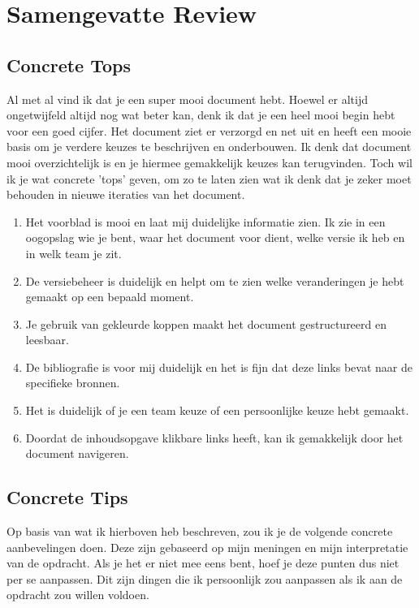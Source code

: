 \documentclass[a4paper]{report}
\begin{document}
\chapter{Samengevatte Review}
\section{Concrete Tops}
Al met al vind ik dat je een super mooi document hebt. Hoewel er altijd ongetwijfeld altijd nog wat beter kan, denk ik dat je een heel mooi begin hebt voor een goed cijfer. 
Het document ziet er verzorgd en net uit en heeft een mooie basis om je verdere keuzes te beschrijven en onderbouwen.
Ik denk dat document mooi overzichtelijk is en je hiermee gemakkelijk keuzes kan terugvinden.
Toch wil ik je wat concrete 'tops' geven, om zo te laten zien wat ik denk dat je zeker moet behouden in nieuwe iteraties van het document. 

\begin{enumerate}
  \item Het voorblad is mooi en laat mij duidelijke informatie zien. Ik zie in een oogopslag wie je bent, waar het document voor dient, welke versie ik heb en in welk team je zit.
  \item De versiebeheer is duidelijk en helpt om te zien welke veranderingen je hebt gemaakt op een bepaald moment.
  \item Je gebruik van gekleurde koppen maakt het document gestructureerd en leesbaar.
  \item De bibliografie is voor mij duidelijk en het is fijn dat deze links bevat naar de specifieke bronnen.
  \item Het is duidelijk of je een team keuze of een persoonlijke keuze hebt gemaakt.
  \item Doordat de inhoudsopgave klikbare links heeft, kan ik gemakkelijk door het document navigeren.
\end{enumerate}

\section{Concrete Tips}
Op basis van wat ik hierboven heb beschreven, zou ik je de volgende concrete aanbevelingen doen. 
Deze zijn gebaseerd op mijn meningen en mijn interpretatie van de opdracht. 
Als je het er niet mee eens bent, hoef je deze punten dus niet per se aanpassen.
Dit zijn dingen die ik persoonlijk zou aanpassen als ik aan de opdracht zou willen voldoen.
\end{document}
